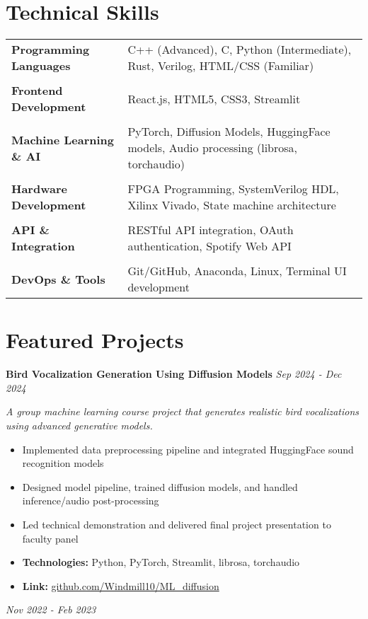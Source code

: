 \documentclass[11pt,a4paper]{article}
\newcommand{\project}[1]{{\large\bfseries #1}}
\newcommand{\skill}[2]{
  \textbf{#1} & #2 \\
}
\begin{document}
\begin{CJK}{UTF8}{bsmi}
\section{Technical Skills}
\begin{tabularx}{\textwidth}{@{}l X@{}}
\skill{Programming Languages}{C++ (Advanced), C, Python (Intermediate), Rust, Verilog, HTML/CSS (Familiar)}\\[0.2cm]
\skill{Frontend Development}{React.js, HTML5, CSS3, Streamlit}\\[0.2cm]
\skill{Machine Learning \& AI}{PyTorch, Diffusion Models, HuggingFace models, Audio processing (librosa, torchaudio)}\\[0.2cm]
\skill{Hardware Development}{FPGA Programming, SystemVerilog HDL, Xilinx Vivado, State machine architecture}\\[0.2cm]
\skill{API \& Integration}{RESTful API integration, OAuth authentication, Spotify Web API}\\[0.2cm]
\skill{DevOps \& Tools}{Git/GitHub, Anaconda, Linux, Terminal UI development}
\end{tabularx}

\section{Featured Projects}

\project{Bird Vocalization Generation Using Diffusion Models} \hfill \textit{Sep 2024 - Dec 2024}

\textit{A group machine learning course project that generates realistic bird vocalizations using advanced generative models.}
\begin{itemize}[leftmargin=*]
    \item Implemented data preprocessing pipeline and integrated HuggingFace sound recognition models
    \item Designed model pipeline, trained diffusion models, and handled inference/audio post-processing
    \item Led technical demonstration and delivered final project presentation to faculty panel
    \item \textbf{Technologies:} Python, PyTorch, Streamlit, librosa, torchaudio
    \item \textbf{Link:} \href{https://github.com/Windmill10/ML_diffusion}{github.com/Windmill10/ML\_diffusion}
\end{itemize}

\vspace{0.3cm}
\noindent\project{Spotify CLI} \hfill \textit{Nov 2022 - Feb 2023}
\vspace{0.3cm}


\end{CJK}
\end{document}
